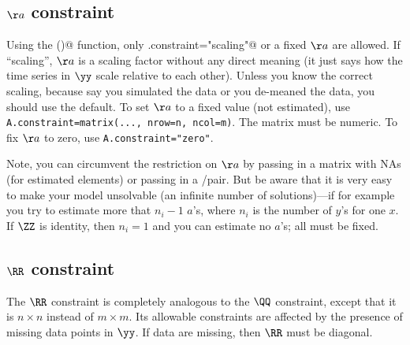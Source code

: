 \subsection{$\aa$ constraint}

Using the \verb@MARSS()@ function, only \verb@A.constraint="scaling"@ or a fixed $\aa$ are allowed.  If ``scaling'', $\aa$ is a scaling factor without any direct meaning (it just says how the time series in $\yy$ scale relative to each other).   Unless you know the correct scaling, because say you simulated the data or you de-meaned the data, you should use the default.   To set $\aa$ to a fixed value (not estimated), use \texttt{A.constraint=matrix(..., nrow=n, ncol=m)}. The matrix must be numeric.  To fix $\aa$ to zero, use \texttt{A.constraint="zero"}.  

Note, you can circumvent the restriction on $\aa$ by passing in a matrix with NAs (for estimated elements) or passing in a \verb@fixed@/\verb@free@ pair.  But be aware that it is very easy to make your model unsolvable (an infinite number of solutions)---if for example you try to estimate more that $n_i-1$ $a$'s, where $n_i$ is the number of $y$'s for one $x$.  If $\ZZ$ is identity, then $n_i=1$ and you can estimate no $a$'s; all must be fixed. 

\subsection{$\RR$ constraint}

The $\RR$ constraint is completely analogous to the $\QQ$ constraint, except that it is $n \times n$ instead of $m \times m$.  Its allowable constraints are affected by the presence of missing data points in $\yy$.  If data are missing, then $\RR$ must be diagonal.
